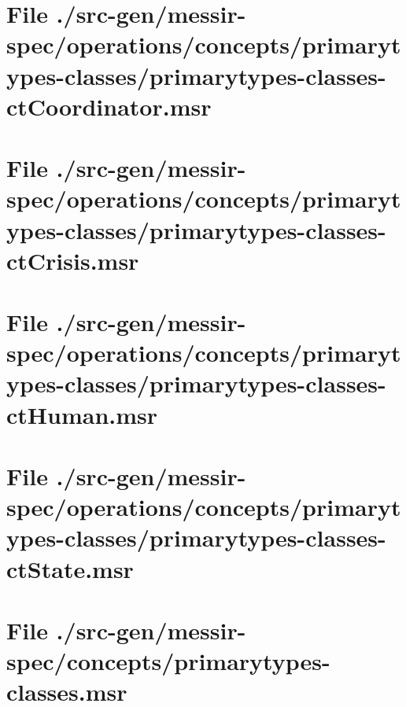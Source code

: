 \section[File /src-gen/messir-spec/operations.../primarytypes-classes-ctCoordinator.msr]{File ./src-gen/messir-spec/operations/concepts/primarytypes-classes/primarytypes-classes-ctCoordinator.msr}
\scriptsize

\normalsize
	
\section[File /src-gen/messir-spec/operations.../primarytypes-classes-ctCrisis.msr]{File ./src-gen/messir-spec/operations/concepts/primarytypes-classes/primarytypes-classes-ctCrisis.msr}
\scriptsize

\normalsize
	
\section[File /src-gen/messir-spec/operations.../primarytypes-classes-ctHuman.msr]{File ./src-gen/messir-spec/operations/concepts/primarytypes-classes/primarytypes-classes-ctHuman.msr}
\scriptsize

\normalsize
	
\section[File /src-gen/messir-spec/operations.../primarytypes-classes-ctState.msr]{File ./src-gen/messir-spec/operations/concepts/primarytypes-classes/primarytypes-classes-ctState.msr}
\scriptsize

\normalsize
	
\section[File /src-gen/messir-spec/concepts/primarytypes-classes.msr]{File ./src-gen/messir-spec/concepts/primarytypes-classes.msr}
\scriptsize

\normalsize
	
